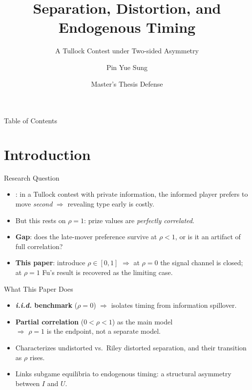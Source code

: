 \documentclass[aspectratio=169, 12pt]{beamer}
\title[Two-sided Asymmetry]{Separation, Distortion, and Endogenous Timing}
\subtitle{A Tullock Contest under Two-sided Asymmetry}
\author{Pin Yue Sung}
\institute[NCCU IB]{Department of International Business\\National Chengchi University}
\date{Master's Thesis Defense}
\newcommand{\rhosep}{\rho^{*}}
\newcommand{\rhodag}{\rho^{\dagger}}
\begin{document}
\begin{frame}
  \titlepage
\end{frame}

\begin{frame}{Table of Contents}
  \tableofcontents
\end{frame}

\section{Introduction}

\begin{frame}{Research Question}
  \begin{itemize}
    \item \citet{fu2006}: in a Tullock contest with private information,
      the informed player prefers to move \emph{second} $\Rightarrow$
      revealing type early is costly.
    \item But this rests on $\rho = 1$: prize values are
      \emph{perfectly correlated}.
    \item \textbf{Gap}: does the late-mover preference survive at $\rho < 1$,
      or is it an artifact of full correlation?
    \item \textbf{This paper}: introduce $\rho \in [0,1]$ $\Rightarrow$
      at $\rho = 0$ the signal channel is closed;
      at $\rho = 1$ Fu's result is recovered as the limiting case.
  \end{itemize}

  \vfill
  \begin{center}
  \end{center}
\end{frame}

\begin{frame}{What This Paper Does}
  \begin{itemize}
    \setlength{\itemsep}{1.2em}
    \item \textbf{\textit{i.i.d.} benchmark} ($\rho = 0$) $\Rightarrow$
      isolates timing from information spillover.
    \item \textbf{Partial correlation} ($0 < \rho < 1$) as the main model\\[5pt]
      $\Rightarrow$ $\rho = 1$ is the endpoint, not a separate model.
    \item Characterizes undistorted vs.\ Riley distorted separation,
      and their transition as $\rho$ rises.
    \item Links subgame equilibria to endogenous timing:
      a structural asymmetry between $I$ and $U$.
  \end{itemize}
\end{frame}
\end{document}
